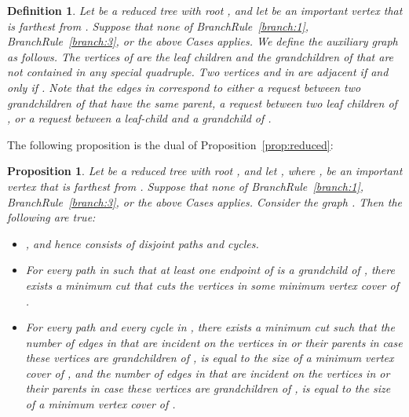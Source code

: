 \documentclass[11pt]{article}
\newtheorem{proposition}[theorem]{Proposition}
\newtheorem{definition}{Definition}[section]
\begin{document}
\begin{definition}\rm
\label{def:auxiliary1}
Let  be a reduced tree with root , and let  be an important vertex that is farthest from . Suppose that none of BranchRule~\ref{branch:1}, BranchRule~\ref{branch:3}, or the above Cases applies. We define the auxiliary graph  as follows. The vertices of 
are the leaf children and the grandchildren of  that are not contained in any special quadruple.  Two vertices  and  in  are adjacent if and only if . Note that the edges in  correspond to either a request between two grandchildren of  that have the same parent, a request between two leaf children of , or a request between a leaf-child and a grandchild of .
\end{definition}


The following proposition is the dual of Proposition~\ref{prop:reduced}:

\begin{proposition}
\label{prop:propertiesbranching}
Let  be a reduced tree with root , and let , where , be an important vertex that is farthest from . Suppose that none of BranchRule~\ref{branch:1}, BranchRule~\ref{branch:3}, or the above Cases applies. Consider the graph . Then the following are true:

\begin{itemize}
\item [(a)] , and hence  consists of disjoint paths and cycles.

\item[(b)] For every path  in  such that at least one endpoint of  is a grandchild of , there exists a minimum cut that cuts the vertices in some minimum vertex cover of .


\item[(c)] For every path  and every cycle  in , there exists a minimum cut  such that the number of edges in  that are incident on the vertices in  or their parents in case these vertices are grandchildren of , is equal to the size of a minimum vertex cover of , and the number of edges in  that are incident on the vertices in  or their parents in case these vertices are grandchildren of , is equal to the size of a minimum vertex cover of .

\end{itemize}
\end{proposition}
\end{document}
